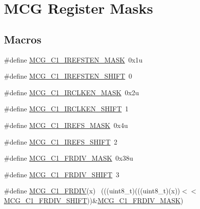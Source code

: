 \hypertarget{group___m_c_g___register___masks}{}\section{M\+CG Register Masks}
\label{group___m_c_g___register___masks}
\subsection*{Macros}
\begin{DoxyCompactItemize}
\item 
\#define \hyperlink{group___m_c_g___register___masks_ga275f9145f8c55ff4c836cbd20ab06139}{M\+C\+G\+\_\+\+C1\+\_\+\+I\+R\+E\+F\+S\+T\+E\+N\+\_\+\+M\+A\+SK}~0x1u
\item 
\#define \hyperlink{group___m_c_g___register___masks_ga10e0a80bfe715350aba6d5f5212617bc}{M\+C\+G\+\_\+\+C1\+\_\+\+I\+R\+E\+F\+S\+T\+E\+N\+\_\+\+S\+H\+I\+FT}~0
\item 
\#define \hyperlink{group___m_c_g___register___masks_ga50398d9dc80a3016fddc6a2aef3df994}{M\+C\+G\+\_\+\+C1\+\_\+\+I\+R\+C\+L\+K\+E\+N\+\_\+\+M\+A\+SK}~0x2u
\item 
\#define \hyperlink{group___m_c_g___register___masks_ga2c4305645e7c2b3977dcd0d35c7eaab9}{M\+C\+G\+\_\+\+C1\+\_\+\+I\+R\+C\+L\+K\+E\+N\+\_\+\+S\+H\+I\+FT}~1
\item 
\#define \hyperlink{group___m_c_g___register___masks_gadc14970d17e8ee736a16805a412a87fe}{M\+C\+G\+\_\+\+C1\+\_\+\+I\+R\+E\+F\+S\+\_\+\+M\+A\+SK}~0x4u
\item 
\#define \hyperlink{group___m_c_g___register___masks_gada376a938782b95d20788418a2564476}{M\+C\+G\+\_\+\+C1\+\_\+\+I\+R\+E\+F\+S\+\_\+\+S\+H\+I\+FT}~2
\item 
\#define \hyperlink{group___m_c_g___register___masks_gac7762b84f41121882f4d1fbcaa839aeb}{M\+C\+G\+\_\+\+C1\+\_\+\+F\+R\+D\+I\+V\+\_\+\+M\+A\+SK}~0x38u
\item 
\#define \hyperlink{group___m_c_g___register___masks_gaee124d0ce81f6e815dbbcac62440708b}{M\+C\+G\+\_\+\+C1\+\_\+\+F\+R\+D\+I\+V\+\_\+\+S\+H\+I\+FT}~3
\item 
\#define \hyperlink{group___m_c_g___register___masks_gae985172a227b87028daa388a2d8f5c93}{M\+C\+G\+\_\+\+C1\+\_\+\+F\+R\+D\+IV}(x)                                                ~(((uint8\+\_\+t)(((uint8\+\_\+t)(x))$<$$<$\hyperlink{group___m_c_g___register___masks_gaee124d0ce81f6e815dbbcac62440708b}{M\+C\+G\+\_\+\+C1\+\_\+\+F\+R\+D\+I\+V\+\_\+\+S\+H\+I\+FT}))\&\hyperlink{group___m_c_g___register___masks_gac7762b84f41121882f4d1fbcaa839aeb}{M\+C\+G\+\_\+\+C1\+\_\+\+F\+R\+D\+I\+V\+\_\+\+M\+A\+SK})
$$
\end{DoxyCompactItemize}
